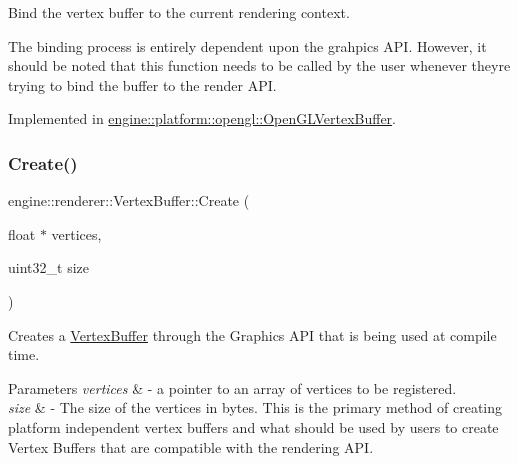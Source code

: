 Bind the vertex buffer to the current rendering context. 

The binding process is entirely dependent upon the grahpics A\+PI. However, it should be noted that this function needs to be called by the user whenever they\textquotesingle{}re trying to bind the buffer to the render A\+PI. 

Implemented in \hyperlink{classengine_1_1platform_1_1opengl_1_1OpenGLVertexBuffer_ac50918719a747f81d7fe94dfcc8dec13}{engine\+::platform\+::opengl\+::\+Open\+G\+L\+Vertex\+Buffer}.

\mbox{\label{classengine_1_1renderer_1_1VertexBuffer_a4c337f1549556946735a47708a55ab9c}} 
\subsubsection{\texorpdfstring{Create()}{Create()}}
{\footnotesize\ttfamily engine\+::renderer\+::\+Vertex\+Buffer\+::\+Create (\begin{DoxyParamCaption}\item[{float $\ast$}]{vertices,  }\item[{uint32\+\_\+t}]{size }\end{DoxyParamCaption})\hspace{0.3cm}{\ttfamily [static]}}



Creates a \hyperlink{classengine_1_1renderer_1_1VertexBuffer}{Vertex\+Buffer} through the Graphics A\+PI that is being used at compile time. 


\begin{DoxyParams}{Parameters}
{\em vertices} & -\/ a pointer to an array of vertices to be registered. \\
\hline
{\em size} & -\/ The size of the vertices in bytes. This is the primary method of creating platform independent vertex buffers and what should be used by users to create Vertex Buffers that are compatible with the rendering A\+PI. \\
\hline
\end{DoxyParams}
\mbox{\label{classengine_1_1renderer_1_1VertexBuffer_a06b240b93506dfd383b3a3f8947eb26f}} 
